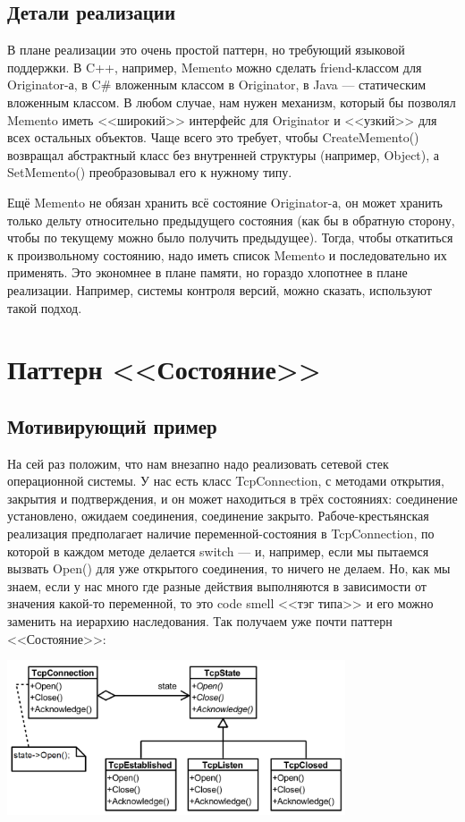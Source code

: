 \documentclass{../../text-style}
\begin{document}
\subsection{Детали реализации}

В плане реализации это очень простой паттерн, но требующий языковой поддержки. В C++, например, Memento можно сделать friend-классом для Originator-а, в C\# вложенным классом в Originator, в Java --- статическим вложенным классом. В любом случае, нам нужен механизм, который бы позволял Memento иметь <<широкий>> интерфейс для Originator и <<узкий>> для всех остальных объектов. Чаще всего это требует, чтобы CreateMemento() возвращал абстрактный класс без внутренней структуры (например, Object), а SetMemento() преобразовывал его к нужному типу.

Ещё Memento не обязан хранить всё состояние Originator-а, он может хранить только дельту относительно предыдущего состояния (как бы в обратную сторону, чтобы по текущему можно было получить предыдущее). Тогда, чтобы откатиться к произвольному состоянию, надо иметь список Memento и последовательно их применять. Это экономнее в плане памяти, но гораздо хлопотнее в плане реализации. Например, системы контроля версий, можно сказать, используют такой подход.

\section{Паттерн <<Состояние>>}

\subsection{Мотивирующий пример}

На сей раз положим, что нам внезапно надо реализовать сетевой стек операционной системы. У нас есть класс TcpConnection, с методами открытия, закрытия и подтверждения, и он может находиться в трёх состояниях: соединение установлено, ожидаем соединения, соединение закрыто. Рабоче-крестьянская реализация предполагает наличие переменной-состояния в TcpConnection, по которой в каждом методе делается switch --- и, например, если мы пытаемся вызвать Open() для уже открытого соединения, то ничего не делаем. Но, как мы знаем, если у нас много где разные действия выполняются в зависимости от значения какой-то переменной, то это code smell <<тэг типа>> и его можно заменить на иерархию наследования. Так получаем уже почти паттерн <<Состояние>>:

\begin{center}
    \includegraphics[width=0.75\textwidth]{stateExample.png}
\end{center}
\end{document}

